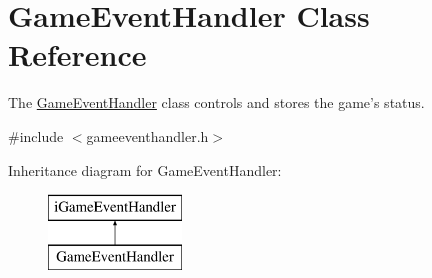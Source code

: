\hypertarget{classGameEventHandler}{\section{Game\-Event\-Handler Class Reference}
\label{classGameEventHandler}
}


The \hyperlink{classGameEventHandler}{Game\-Event\-Handler} class controls and stores the game's status.  




{\ttfamily \#include $<$gameeventhandler.\-h$>$}

Inheritance diagram for Game\-Event\-Handler\-:\begin{figure}[H]
\begin{center}
\leavevmode
\includegraphics[height=2.000000cm]{classGameEventHandler}
\end{center}
\end{figure}

